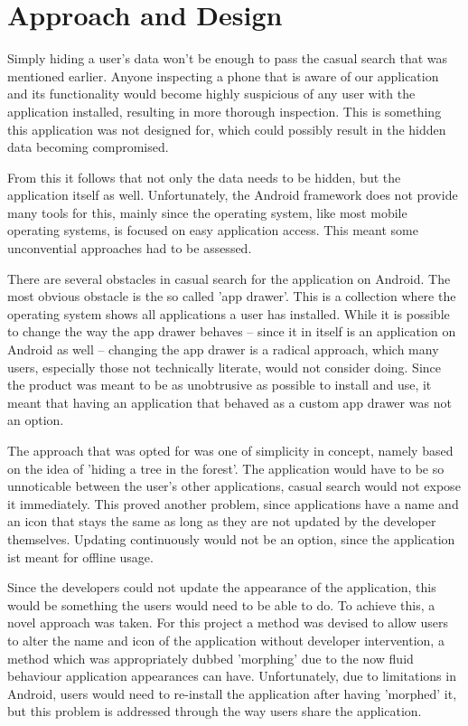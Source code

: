 \section{Approach and Design}
\label{sec:approach-and-design}

Simply hiding a user's data won't be enough to pass the casual search that was mentioned earlier. 
Anyone inspecting a phone that is aware of our application and its functionality would become highly suspicious of any user with the application installed, resulting in more thorough inspection. 
This is something this application was not designed for, which could possibly result in the hidden data becoming compromised. 

From this it follows that not only the data needs to be hidden, but the application itself as well. 
Unfortunately, the Android framework does not provide many tools for this, mainly since the operating system, like most mobile operating systems, is focused on easy application access. 
This meant some unconvential approaches had to be assessed.

There are several obstacles in casual search for the application on Android. 
The most obvious obstacle is the so called 'app drawer'. 
This is a collection where the operating system shows all applications a user has installed.
While it is possible to change the way the app drawer behaves -- since it in itself is an application on Android as well -- changing the app drawer is a radical approach, which many users, especially those not technically literate, would not consider doing.
Since the product was meant to be as unobtrusive as possible to install and use, it meant that having an application that behaved as a custom app drawer was not an option.

The approach that was opted for was one of simplicity in concept, namely based on the idea of 'hiding a tree in the forest'. 
The application would have to be so unnoticable between the user's other applications, casual search would not expose it immediately. 
This proved another problem, since applications have a name and an icon that stays the same as long as they are not updated by the developer themselves. 
Updating continuously would not be an option, since the application ist meant for offline usage. 

Since the developers could not update the appearance of the application, this would be something the users would need to be able to do.
To achieve this, a novel approach was taken.
For this project a method was devised to allow users to alter the name and icon of the application without developer intervention, a method which was appropriately dubbed 'morphing' due to the now fluid behaviour application appearances can have.
Unfortunately, due to limitations in Android, users would need to re-install the application after having 'morphed' it, but this problem is addressed through the way users share the application.

